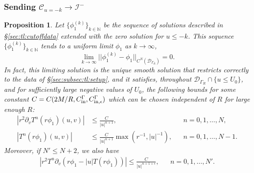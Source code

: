 \documentclass[11pt,english]{article}
\numberwithin{equation}{section}
\theoremstyle{remark}
\theoremstyle{plain}
\newtheorem{prop}{Proposition}[section]
\theoremstyle{remark}
\newcommand{\pv}{\partial_v}
\renewcommand{\(}{\left(}
\renewcommand{\)}{\right)}
\begin{document}
\subsubsection{Sending \texorpdfstring{$\mathcal{C}_{u=-k}\to\mathcal{I}^-$}{C(u=-k) to I-}}
\begin{prop}\label{prop:tl:limit}
Let $\{\phi_1^{(k)}\}_{k\in\mathbb{N}}$ be the sequence of solutions described in \S\ref{sec:tl:cutoffdata} extended with the zero solution for $u\leq -k$. This sequence $\{\phi_1^{(k)}\}_{k\in\mathbb{N}}$ tends to a uniform limit $\phi_1$ as $k\to\infty$,
\begin{equation}
\lim_{k\to\infty}||\phi_1^{(k)}-\phi_1 	||_{C^N(\mathcal{D}_{\Gamma_R})}=0.
\end{equation}
In fact, this limiting solution is the unique smooth solution that restricts correctly to the data of \S \ref{sec:subsec:tl:setup}, and it satisfies, throughout $\mathcal{D}_{\Gamma_R}\cap\{u\leq U_0\}$, and for sufficiently large negative values of $U_0$, the following bounds for some constant $C=C(2M/R,C_{\mathrm{in}}^\Gamma,C_{\mathrm{in},\epsilon}^\Gamma)$ which can be chosen independent of $R$ for large enough $R$:
\begin{align}\label{eq:proplimit2}
\left|r^2\pv T^n (r\phi_1)(u,v)\right|&\leq \frac{C}{|u|^{n+1}},&&n=0,1,\dots,N,\\
\left|T^n (r\phi_1)(u,v)\right|&\leq \frac{C}{|u|^{n+1}}\max\left(r^{-1},|u|^{-1}\right),&&n=0,1,\dots,N-1.\label{eq:proplimit3}
\end{align}
Moreover, if $N'\leq N+2$, we also have
\begin{align}\label{eq:proplimit4}
\left|r^2T^n\pv(r\phi_1-|u|T(r\phi_1))\right|\leq \frac{C}{|u|^{n+1+\epsilon}},&& n=0,1,\dots,N'.
\end{align}
\end{prop}
\end{document}
